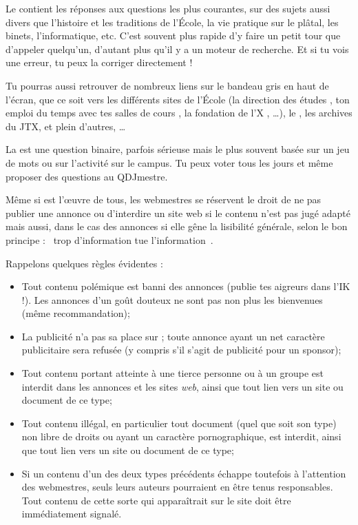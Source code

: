 Le  contient les r\'eponses aux questions les plus courantes, sur des sujets aussi divers que l'histoire et les traditions de l'\'Ecole, la
vie pratique sur le pl\^atal, les binets, l'informatique, etc. C'est souvent plus rapide d'y faire un petit tour que d'appeler quelqu'un, d'autant plus qu'il y a
un moteur de recherche. Et si tu vois une erreur, tu peux la corriger directement !

Tu pourras aussi retrouver de nombreux liens sur le bandeau gris en haut de l'écran, que ce soit vers les différents sites de l'\'Ecole (la direction des études , ton emploi du temps avec tes salles de cours , la fondation de l'X , \dots), le , les archives du JTX, et plein d'autres, \dots


La  est une question binaire, parfois s\'erieuse mais le
plus souvent bas\'ee sur un jeu de mots ou sur l'activit\'e sur le
campus. Tu peux voter tous les jours et m\^eme proposer des questions
au QDJmestre.

M\^eme si \fkz est l'\oe uvre de tous, les webmestres se r\'eservent le droit de ne pas publier une annonce ou d'interdire un site web si le contenu
n'est pas jug\'e adapt\'e mais aussi, dans le cas des annonces si elle g\^ene la lisibilit\'e g\'en\'erale, selon le bon principe : \guillemotleft~trop
d'information tue l'information~\guillemotright .

Rappelons quelques r\`egles \'evidentes :
\begin{itemize}
 \item Tout contenu pol\'emique est banni des annonces (publie tes aigreurs dans l'IK !).
       Les annonces d'un go\^ut douteux ne sont pas non plus les bienvenues (m\^eme recommandation);
 \item La publicit\'e n'a pas sa place sur \fkz ; toute annonce ayant un net caract\`ere publicitaire
       sera refus\'ee (y compris s'il s'agit de publicit\'e pour un sponsor);
 \item Tout contenu portant atteinte \`a  une tierce personne ou \`a  un groupe est interdit dans les annonces
       et les sites \emph{web}, ainsi que tout lien vers un site ou document de ce type;
 \item Tout contenu ill\'egal, en particulier tout document (quel que soit son type)
       non libre de droits ou ayant un caract\`ere pornographique, est interdit,
       ainsi que tout lien vers un site ou document de ce type;
 \item Si un contenu d'un des deux types pr\'ec\'edents \'echappe toutefois \`a  l'attention des webmestres,
       seuls leurs auteurs pourraient en \^etre tenus responsables.
       Tout contenu de cette sorte qui appara\^itrait sur le site doit \^etre imm\'ediatement signal\'e.
\end{itemize}

